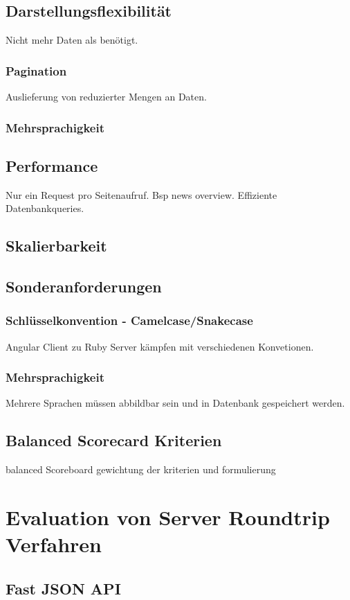 \section{Darstellungsflexibilität}
Nicht mehr Daten als benötigt.
\subsection{Pagination}
Auslieferung von reduzierter Mengen an Daten.
\subsection{Mehrsprachigkeit}

\section{Performance}
Nur ein Request pro Seitenaufruf. Bsp news overview. Effiziente Datenbankqueries.

\section{Skalierbarkeit}

\section{Sonderanforderungen}
\subsection{Schlüsselkonvention - Camelcase/Snakecase}
Angular Client zu Ruby Server kämpfen mit verschiedenen Konvetionen.
\subsection{Mehrsprachigkeit}
Mehrere Sprachen müssen abbildbar sein und in Datenbank gespeichert werden.
\section{Balanced Scorecard Kriterien}
balanced Scoreboard gewichtung der kriterien und formulierung
\chapter{Evaluation von Server Roundtrip Verfahren}

\section{Fast JSON API}
